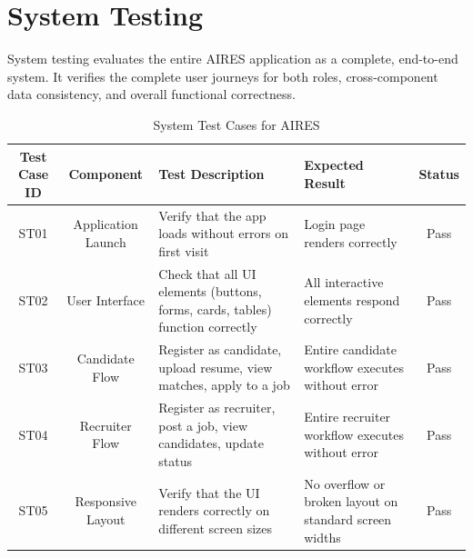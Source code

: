 \section{System Testing}
System testing evaluates the entire AIRES application as a complete, end-to-end system. It verifies the complete user journeys for both roles, cross-component data consistency, and overall functional correctness.
\begin{table}[H]
    \centering
    \renewcommand{\arraystretch}{1.3}
    \begin{tabular}{|c|c|p{4cm}|p{3cm}|c|}
        \hline
        \textbf{Test Case ID} & \textbf{Component} & \textbf{Test Description} & \textbf{Expected Result} & \textbf{Status} \\
        \hline
        ST01 & Application Launch & Verify that the app loads without errors on first visit & Login page renders correctly & Pass \\
        \hline
        ST02 & User Interface & Check that all UI elements (buttons, forms, cards, tables) function correctly & All interactive elements respond correctly & Pass \\
        \hline
        ST03 & Candidate Flow & Register as candidate, upload resume, view matches, apply to a job & Entire candidate workflow executes without error & Pass \\
        \hline
        ST04 & Recruiter Flow & Register as recruiter, post a job, view candidates, update status & Entire recruiter workflow executes without error & Pass \\
        \hline
        ST05 & Responsive Layout & Verify that the UI renders correctly on different screen sizes & No overflow or broken layout on standard screen widths & Pass \\
        \hline
    \end{tabular}
    \caption{System Test Cases for AIRES}
    \label{tab:system_tests}
\end{table}
\newpage
